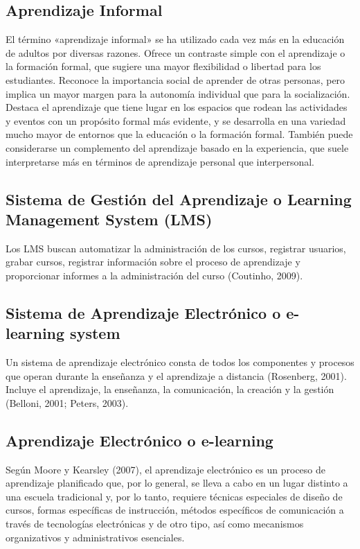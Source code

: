 \subsection{Aprendizaje Informal}
El término «aprendizaje informal» se ha utilizado cada vez más en la educación
de adultos por diversas razones. Ofrece un contraste simple con el aprendizaje o
la formación formal, que sugiere una mayor flexibilidad o libertad para los
estudiantes. Reconoce la importancia social de aprender de otras personas, pero
implica un mayor margen para la autonomía individual que para la socialización.
Destaca el aprendizaje que tiene lugar en los espacios que rodean las
actividades y eventos con un propósito formal más evidente, y se desarrolla en
una variedad mucho mayor de entornos que la educación o la formación formal.
También puede considerarse un complemento del aprendizaje basado en la
experiencia, que suele interpretarse más en términos de aprendizaje personal que
interpersonal.
\cite{article:informal_learning_eraut}

\subsection{Sistema de Gestión del Aprendizaje o Learning Management System (LMS)}
Los LMS buscan automatizar la administración de los cursos, registrar usuarios,
grabar cursos, registrar información sobre el proceso de aprendizaje y
proporcionar informes a la administración del curso (Coutinho, 2009).
\cite{article:learning_oliveira}

\subsection{Sistema de Aprendizaje Electrónico o e-learning system}
Un sistema de aprendizaje electrónico consta de todos los componentes y procesos
que operan durante la enseñanza y el aprendizaje a distancia (Rosenberg, 2001).
Incluye el aprendizaje, la enseñanza, la comunicación, la creación y la gestión
(Belloni, 2001; Peters, 2003). 
\cite{article:learning_oliveira}

\subsection{Aprendizaje Electrónico o e-learning}
Según Moore y Kearsley (2007), el aprendizaje electrónico es un proceso de
aprendizaje planificado que, por lo general, se lleva a cabo en un lugar
distinto a una escuela tradicional y, por lo tanto, requiere técnicas especiales
de diseño de cursos, formas específicas de instrucción, métodos específicos de
comunicación a través de tecnologías electrónicas y de otro tipo, así como
mecanismos organizativos y administrativos esenciales.
\cite{article:learning_oliveira}

